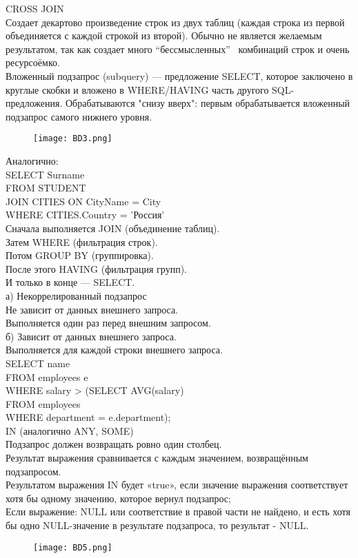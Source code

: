 \noindent CROSS JOIN \\
Создает декартово произведение строк из двух таблиц (каждая строка из первой объединяется с каждой строкой из второй). Обычно не является желаемым результатом, так как создает много “бессмысленных” \, комбинаций строк и очень ресурсоёмко. \\

\noindent Вложенный подзапрос (subquery) — предложение SELECT, которое заключено в круглые скобки и вложено в WHERE/HAVING часть другого SQL- предложения. Обрабатываются "снизу вверх": первым обрабатывается вложенный подзапрос самого нижнего уровня.
\begin{figure}[H]
    \centering
    \texttt{[image: BD3.png]}
\end{figure}
\noindent Аналогично: \\
SELECT Surname \\
FROM STUDENT \\ 
JOIN CITIES ON CityName = City \\
WHERE CITIES.Country = 'Россия' \\

\noindent Сначала выполняется JOIN (объединение таблиц). \\
Затем WHERE (фильтрация строк). \\
Потом GROUP BY (группировка). \\
После этого HAVING (фильтрация групп). \\
И только в конце — SELECT. \\

\noindent а) Некоррелированный подзапрос \\
Не зависит от данных внешнего запроса. \\
Выполняется один раз перед внешним запросом. \\

\noindent б) Зависит от данных внешнего запроса. \\
Выполняется для каждой строки внешнего запроса. \\
SELECT name \\
FROM employees e \\
WHERE salary > (SELECT AVG(salary) \\
FROM employees \\
WHERE department = e.department); \\

\noindent IN (аналогично ANY, SOME) \\
Подзапрос должен возвращать ровно один столбец. \\
Результат выражения сравнивается с каждым
значением, возвращённым подзапросом. \\
Результатом выражения IN будет «true», если значение выражения соответствует хотя бы одному значению, которое вернул подзапрос;  \\
Если выражение: NULL или соответствие в правой части не найдено, и есть хотя бы одно NULL-значение в результате подзапроса, то результат - NULL. \\
\begin{figure}[H]
    \centering
    \texttt{[image: BD5.png]}
\end{figure}

